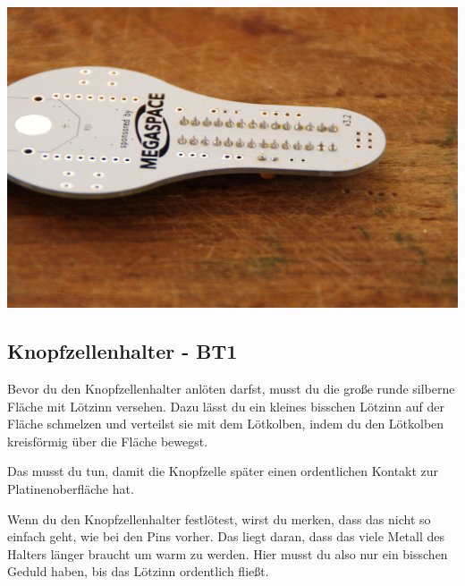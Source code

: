 \documentclass{article}
\begin{document}
\begin{minipage}[b]{0.5\textwidth}
	\includegraphics[width=\textwidth]{Bilder2023/IMG_8356.JPG}
\end{minipage}

\subsection{Knopfzellenhalter - BT1}

Bevor du den Knopfzellenhalter anlöten darfst, musst du die große runde silberne Fläche mit Lötzinn versehen. Dazu lässt du ein kleines bisschen Lötzinn auf der Fläche schmelzen und verteilst sie mit dem Lötkolben, indem du den Lötkolben kreisförmig über die Fläche bewegst.

Das musst du tun, damit die Knopfzelle später einen ordentlichen Kontakt zur Platinenoberfläche hat.

Wenn du den Knopfzellenhalter festlötest, wirst du merken, dass das nicht so einfach geht, wie bei den Pins vorher. Das liegt daran, dass das viele Metall des Halters länger braucht um warm zu werden. Hier musst du also nur ein bisschen Geduld haben, bis das Lötzinn ordentlich fließt.

\vspace{1cm}
\end{document}
